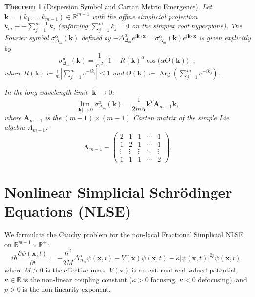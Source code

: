 \documentclass[11pt,a4paper]{article}
\theoremstyle{plain}
\newtheorem{theorem}{Theorem}[section]
\theoremstyle{definition}
\theoremstyle{remark}
\numberwithin{equation}{section}
\begin{document}
\begin{theorem}[Dispersion Symbol and Cartan Metric Emergence]
\label{thm:dispersion}
Let $\mathbf{k} = (k_1, \dots, k_{m-1}) \in \mathbb{R}^{m-1}$ with the affine simplicial projection $k_m \equiv -\sum_{j=1}^{m-1} k_j$ (enforcing $\sum_{j=1}^m k_j = 0$ on the simplex root hyperplane). The Fourier symbol $\sigma_{\Delta_m}^\alpha(\mathbf{k})$ defined by $-\Delta_{\Delta_m}^\alpha e^{i\mathbf{k}\cdot\mathbf{x}} = \sigma_{\Delta_m}^\alpha(\mathbf{k}) e^{i\mathbf{k}\cdot\mathbf{x}}$ is given explicitly by
\begin{equation}
\sigma_{\Delta_m}^\alpha(\mathbf{k}) = \frac{1}{\alpha^2}\left[1 - R(\mathbf{k})^\alpha \cos\big(\alpha \Theta(\mathbf{k})\big)\right],
\end{equation}
where $R(\mathbf{k}) \coloneqq \frac{1}{m}\left|\sum_{j=1}^m e^{-ik_j}\right| \le 1$ and $\Theta(\mathbf{k}) \coloneqq \operatorname{Arg}\left(\sum_{j=1}^m e^{-ik_j}\right)$.

In the long-wavelength limit $|\mathbf{k}| \to 0$:
\begin{equation}
\lim_{|\mathbf{k}| \to 0} \sigma_{\Delta_m}^\alpha(\mathbf{k}) = \frac{1}{2m\alpha}\mathbf{k}^T \mathbf{A}_{m-1}\mathbf{k},
\end{equation}
where $\mathbf{A}_{m-1}$ is the $(m-1)\times(m-1)$ Cartan matrix of the simple Lie algebra $A_{m-1}$:
\begin{equation}
\mathbf{A}_{m-1} = \begin{pmatrix}
2 & 1 & 1 & \cdots & 1 \\
1 & 2 & 1 & \cdots & 1 \\
\vdots & \vdots & \vdots & \ddots & \vdots \\
1 & 1 & 1 & \cdots & 2
\end{pmatrix}.
\end{equation}
\end{theorem}

\section{Nonlinear Simplicial Schr\"odinger Equations (NLSE)}

We formulate the Cauchy problem for the non-local Fractional Simplicial NLSE on $\mathbb{R}^{m-1} \times \mathbb{R}^+$:
\begin{equation}
\label{eq:nlse_main}
i \hbar \frac{\partial \psi(\mathbf{x}, t)}{\partial t} = -\frac{\hbar^2}{2M}\Delta_{\Delta_m}^\alpha \psi(\mathbf{x}, t) + V(\mathbf{x})\psi(\mathbf{x}, t) - \kappa |\psi(\mathbf{x}, t)|^{2p}\psi(\mathbf{x}, t),
\end{equation}
where $M > 0$ is the effective mass, $V(\mathbf{x})$ is an external real-valued potential, $\kappa \in \mathbb{R}$ is the non-linear coupling constant ($\kappa > 0$ focusing, $\kappa < 0$ defocusing), and $p > 0$ is the non-linearity exponent.
\end{document}

